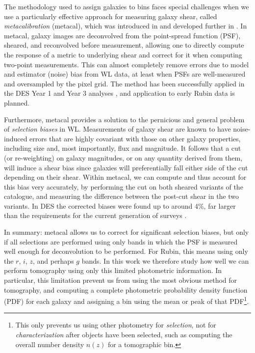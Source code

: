 \documentclass[twocolumn,twocolappendix]{aastex63}
\begin{document}
The methodology used to assign galaxies to bins faces special challenges when we use a particularly
effective approach for measuring galaxy shear, called \emph{metacalibration} (metacal),
which was introduced in \citet{sheldonhuff} and developed further in \citet{sheldon}.
In metacal, galaxy images are deconvolved from the point-spread function (PSF), sheared, and
reconvolved before measurement, allowing one to directly compute the response of a metric
to underlying shear and correct for it when computing two-point measurements.  This can
almost completely remove errors due to model and estimator (noise) bias from WL data, at least
when PSFs are well-measured and oversampled by the pixel grid.  The method has been successfully
applied in the DES Year 1 and Year 3 analyses \citep{des-y1-cat, des-y3-cat},
and application to early Rubin data is planned.

Furthermore, metacal provides a solution to the pernicious and general problem of
\emph{selection biases} in WL.  Measurements of galaxy shear are known to have noise-induced errors
that are
highly covariant with those on other galaxy properties, including size and, most importantly, flux and
magnitude.  It follows that a cut (or re-weighting) on galaxy magnitudes, or on any quantity derived
from  them, will induce a shear bias since galaxies will preferentially fall either side of the cut
depending on their shear.  Within metacal, we can compute and thus account for this bias
very accurately, by performing the cut on both
sheared variants of the catalogue, and measuring the difference between the post-cut shear in the two
variants.  In DES the corrected biases were found up to around 4\%, far larger than
the requirements for the current generation of surveys \citep{des-y1-cat}.

In summary: metacal allows us to correct for significant selection biases, but only if all selections
are performed using only bands in which the PSF is measured well enough for deconvolution to be
performed.  For Rubin, this means using only the $r$, $i$, $z$, and perhaps $g$ bands.  In this work we
therefore study how well we can perform tomography using only this limited photometric information.  In
particular, this limitation prevent us from using the most obvious method for tomography,
and computing a complete photometric probability density function (PDF) for each galaxy and assigning
a bin using the mean or peak of that PDF\footnote{This only prevents us using other photometry for \emph{selection}, not for \emph{characterization} after objects have been selected, such as computing the overall
number density $n(z)$ for a tomographic bin.}.
\end{document}
